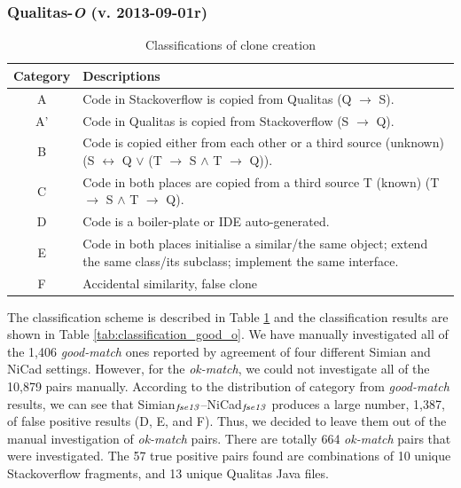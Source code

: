 \documentclass{IEEEtran}
\begin{document}
\subsubsection{Qualitas-\textit{O} (v. 2013-09-01r)}
\begin{table}[H]
	\centering
	\caption{Classifications of clone creation}
	\label{tab:classification_scheme}
	\begin{tabular}{|c|p{13cm}|}
		\hline 
		Category & Descriptions \\ 
		\hline 
		A & Code in Stackoverflow is copied from Qualitas (Q $\rightarrow$ S). \\ 
		\hline 
		A' & Code in Qualitas is copied from Stackoverflow (S $\rightarrow$ Q). \\ 
		\hline 
		B & Code is copied either from each other or a third source (unknown) (S $\leftrightarrow$ Q $\vee$ (T $\rightarrow$ S $\wedge$ T $\rightarrow$ Q)).
		\\ 
		\hline 
		C & Code in both places are copied from a third source T (known) (T $\rightarrow$ S $\wedge$ T $\rightarrow$ Q).
		\\ 
		\hline 
		D & Code is a boiler-plate or IDE auto-generated.
		\\ 
		\hline 
		E & Code in both places initialise a similar/the same object; extend the same class/its subclass; implement the same interface.
		\\ 
		\hline 
		F & Accidental similarity, false clone \\ 
		\hline 
	\end{tabular} 
\end{table}

The classification scheme is described in Table \ref{tab:classification_scheme} and the classification results are shown in Table \ref{tab:classification_good_o}. We have manually investigated all of the 1,406 \textit{good-match} ones reported by agreement of four different Simian and NiCad settings.  However, for the \textit{ok-match}, we could not investigate all of the 10,879 pairs manually.  According to the distribution of category from \textit{good-match} results, we can see that Simian$_{\textrm{\textit{fse13}}}$--NiCad$_{\textrm{\textit{fse13}}}$ produces a large number, 1,387, of false positive results (D, E, and F). Thus, we decided to leave them out of the manual investigation of \textit{ok-match} pairs. There are totally 664 \textit{ok-match} pairs that were investigated. The 57 true positive pairs found are combinations of 10 unique Stackoverflow fragments, and 13 unique Qualitas Java files.
\end{document}
